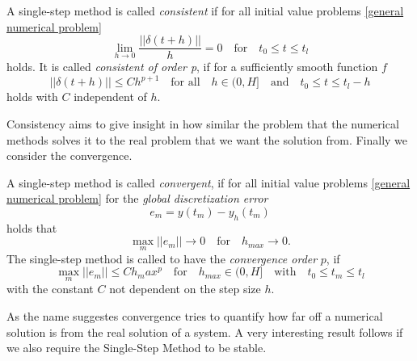 	\begin{definition}\label{Consistency_SingleStep}
		A single-step method is called \emph{consistent} if for all initial value problems \eqref{general numerical problem} 
		\begin{equation}
			\lim\limits_{h \to 0} \frac{||\delta(t+h)||}{h} = 0 \quad \text{for} \quad t_0 \leq t \leq t_l
		\end{equation}
		holds.\newline
		It is called \emph{consistent of order p}, if for a sufficiently smooth function $f$
		\begin{equation}
			||\delta(t+h)|| \leq Ch^{p+1} \quad \text{for all} \quad h \in \mathopen{(} 0,H \mathclose{]} \quad \text{and} \quad t_0 \leq t \leq t_l - h
		\end{equation}
		holds with $C$ independent of $h$.
	\end{definition}

	Consistency aims to give insight in how similar the problem that the numerical methods solves it to the real problem that we want the solution from. Finally we consider the convergence.

	\begin{definition}\label{Convergence_SingleStep}
		A single-step method is called \emph{convergent}, if for all initial value problems \ref{general numerical problem} for the \emph{global discretization error}
		\begin{displaymath}
			e_m = y(t_m)-y_h(t_m)
		\end{displaymath}
		holds that
		\begin{displaymath}
			\max\limits_{m}||e_m|| \to 0 \quad \text{for} \quad h_{max} \to 0.
		\end{displaymath}
		The single-step method is called to have the \emph{convergence order} $p$, if
		\begin{displaymath}
			\max\limits_{m} ||e_m|| \leq C h_max^p \quad \text{for} \quad h_{max} \in \mathopen{(} 0,H \mathclose{]} \quad \text{with} \quad t_0 \leq t_m \leq t_l
		\end{displaymath}
		with the constant $C$ not dependent on the step size $h$.
	\end{definition}

	As the name suggestes convergence tries to quantify how far off a numerical solution is from the real solution of a system. A very interesting result follows if we also require the Single-Step Method to be stable.
	
